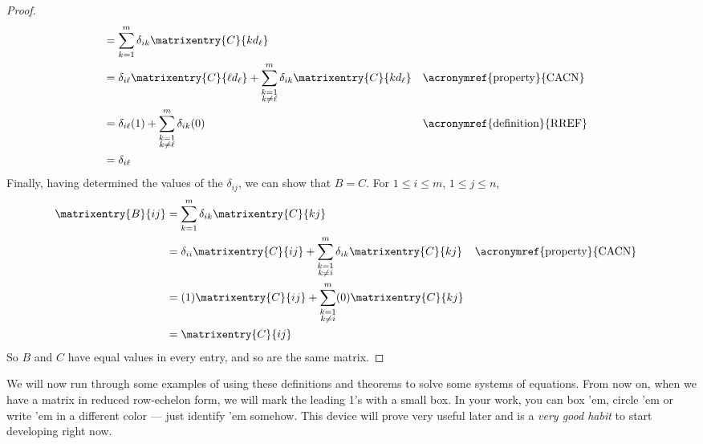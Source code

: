 \begin{proof}
\begin{align*}
%
&=\sum_{k=1}^{m}\delta_{ik}\matrixentry{C}{kd_\ell}\\
%
%
&=
\delta_{i\ell}\matrixentry{C}{\ell d_\ell}
+
\sum_{\substack{k=1\\k\neq\ell}}^{m}\delta_{ik}\matrixentry{C}{kd_\ell}
&&\text{\acronymref{property}{CACN}}\\
%
&=
\delta_{i\ell}(1)
+
\sum_{\substack{k=1\\k\neq\ell}}^{m}\delta_{ik}(0)
&&\text{\acronymref{definition}{RREF}}\\
%
&=\delta_{i\ell}
%
\end{align*}
%
Finally, having determined the values of the $\delta_{ij}$, we can show that $B=C$.  For $1\leq i\leq m$, $1\leq j\leq n$,
%
\begin{align*}
\matrixentry{B}{ij}
&=\sum_{k=1}^{m}\delta_{ik}\matrixentry{C}{kj}\\
&=
\delta_{ii}\matrixentry{C}{ij}
+
\sum_{\substack{k=1\\k\neq i}}^{m}\delta_{ik}\matrixentry{C}{kj}
&&\text{\acronymref{property}{CACN}}\\
%
&=
(1)\matrixentry{C}{ij}
+
\sum_{\substack{k=1\\k\neq i}}^{m}(0)\matrixentry{C}{kj}\\
%
&=\matrixentry{C}{ij}
%
\end{align*}
%
So $B$ and $C$ have equal values in every entry, and so are the same matrix.
%
\end{proof}
%
We will now run through some examples of using these definitions and theorems to solve some systems of equations.  From now on, when we have a matrix in reduced row-echelon form, we will mark the leading 1's with a small box.  In your work, you can box 'em, circle 'em or write 'em in a different color --- just identify 'em somehow.  This device will prove very useful later and is a \emph{very good habit} to start developing right now.
%
